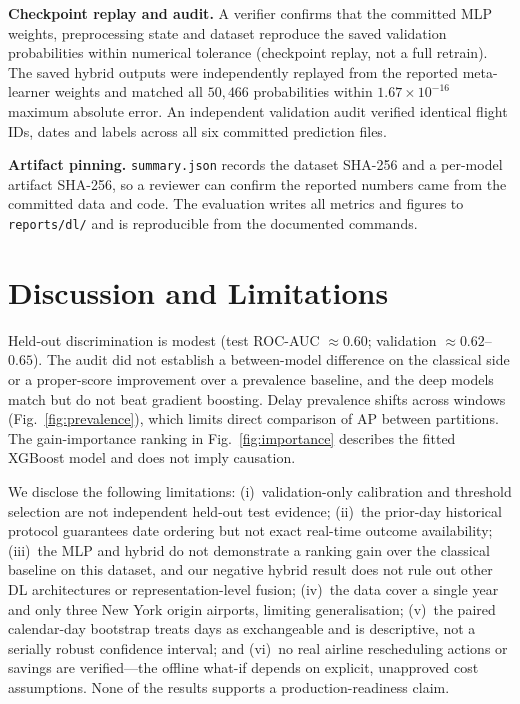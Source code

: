 \documentclass[conference]{IEEEtran}
\newcommand{\code}[1]{\texttt{#1}}
\begin{document}
\textbf{Checkpoint replay and audit.}
A verifier confirms that the committed MLP weights, preprocessing state and
dataset reproduce the saved validation probabilities within numerical tolerance
(checkpoint replay, not a full retrain). The saved hybrid outputs were
independently replayed from the reported meta-learner weights and matched all
$50{,}466$ probabilities within $1.67\times10^{-16}$ maximum absolute error. An
independent validation audit verified identical flight IDs, dates and labels
across all six committed prediction files.

\textbf{Artifact pinning.}
\code{summary.json} records the dataset SHA-256 and a per-model artifact SHA-256,
so a reviewer can confirm the reported numbers came from the committed data and
code. The evaluation writes all metrics and figures to \code{reports/dl/} and is
reproducible from the documented commands.

\section{Discussion and Limitations}
\label{sec:discussion}
Held-out discrimination is modest (test ROC-AUC $\approx 0.60$; validation
$\approx 0.62$--$0.65$). The audit did not establish a between-model difference on
the classical side or a proper-score improvement over a prevalence baseline, and
the deep models match but do not beat gradient boosting. Delay prevalence shifts
across windows (Fig.~\ref{fig:prevalence}), which limits direct comparison of AP
between partitions. The gain-importance ranking in Fig.~\ref{fig:importance}
describes the fitted XGBoost model and does not imply causation.

We disclose the following limitations: (i)~validation-only calibration and
threshold selection are not independent held-out test evidence; (ii)~the prior-day
historical protocol guarantees date ordering but not exact real-time outcome
availability; (iii)~the MLP and hybrid do not demonstrate a ranking gain over the
classical baseline on this dataset, and our negative hybrid result does not rule
out other DL architectures or representation-level fusion; (iv)~the data cover a
single year and only three New York origin airports, limiting generalisation;
(v)~the paired calendar-day bootstrap treats days as exchangeable and is
descriptive, not a serially robust confidence interval; and (vi)~no real airline
rescheduling actions or savings are verified---the offline what-if depends on
explicit, unapproved cost assumptions. None of the results supports a
production-readiness claim.
\end{document}
